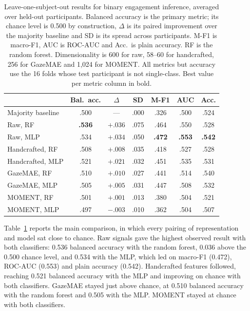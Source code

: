 \begin{table}[t]
	\caption{Leave-one-subject-out results for binary engagement inference, averaged over held-out participants.
		Balanced accuracy is the primary metric; its chance level is 0.500 by construction, $\Delta$ is its paired improvement over the majority baseline and SD is its spread across participants.
		M-F1 is macro-F1, AUC is ROC-AUC and Acc.\ is plain accuracy.
		RF is the random forest.
		Dimensionality is 600 for raw, 58--60 for handcrafted, 256 for GazeMAE and 1{,}024 for MOMENT.
		All metrics but accuracy use the 16 folds whose test participant is not single-class.
		Best value per metric column in bold.}
	\label{tab:main}
	\footnotesize
	\begin{tabular*}{\columnwidth}{@{\extracolsep{\fill}}lcccccc@{}}
		\toprule
		                  & Bal.\ acc.    & $\Delta$         & SD   & M-F1          & AUC           & Acc.          \\
		\midrule
		Majority baseline & .500          & ---              & .000 & .326          & .500          & .524          \\
		\midrule
		Raw, RF           & \textbf{.536} & $\mathbf{+.036}$ & .075 & .464          & .550          & .528          \\
		Raw, MLP          & .534          & $+.034$          & .050 & \textbf{.472} & \textbf{.553} & \textbf{.542} \\
		Handcrafted, RF   & .508          & $+.008$          & .035 & .418          & .527          & .528          \\
		Handcrafted, MLP  & .521          & $+.021$          & .032 & .451          & .535          & .531          \\
		GazeMAE, RF       & .510          & $+.010$          & .027 & .441          & .514          & .540          \\
		GazeMAE, MLP      & .505          & $+.005$          & .031 & .447          & .508          & .532          \\
		MOMENT, RF        & .501          & $+.001$          & .013 & .380          & .504          & .521          \\
		MOMENT, MLP       & .497          & $-.003$          & .010 & .362          & .504          & .507          \\
		\bottomrule
	\end{tabular*}
\end{table}

Table~\ref{tab:main} reports the main comparison, in which every pairing of representation and model sat close to chance.
Raw signals gave the highest observed result with both classifiers: 0.536 balanced accuracy with the random forest, 0.036 above the 0.500 chance level, and 0.534 with the MLP, which led on macro-F1 (0.472), ROC-AUC (0.553) and plain accuracy (0.542).
Handcrafted features followed, reaching 0.521 balanced accuracy with the MLP and improving on chance with both classifiers.
GazeMAE stayed just above chance, at 0.510 balanced accuracy with the random forest and 0.505 with the MLP\@.
MOMENT stayed at chance with both classifiers.

